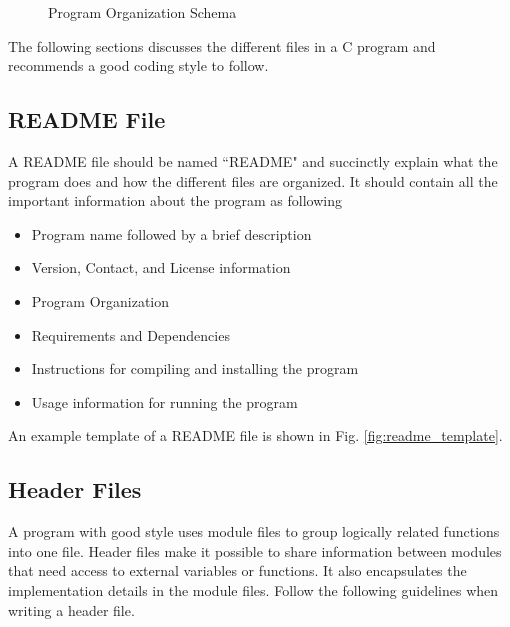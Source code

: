 \documentclass[11pt]{article}
\begin{document}
\begin{figure}[H]
	\centering
	\caption{Program Organization Schema}
	\label{fig:org_schema}
\end{figure}

The following sections discusses the different files in a C program and recommends a good coding style to follow.

\subsection{README File}
A README file should be named ``README" and succinctly explain what the program does and how the different files are organized. It should contain all the important information about the program as following

\begin{itemize}
	\item Program name followed by a brief description
	\item Version, Contact, and License information
	\item Program Organization
	\item Requirements and Dependencies
	\item Instructions for compiling and installing the program
	\item Usage information for running the program
\end{itemize}

An example template of a README file is shown in Fig. \ref{fig:readme_template}.



\subsection{Header Files}
A program with good style uses module files to group logically related functions into one file. Header files make it possible to share information between modules that need access to external variables or functions. It also encapsulates the implementation details in the module files. Follow the following guidelines when writing a header file.
\end{document}
